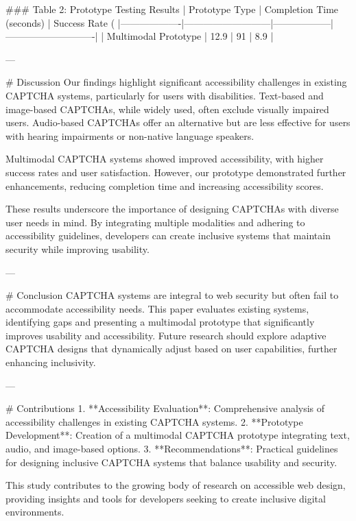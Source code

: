 ### Table 2: Prototype Testing Results  
| Prototype Type    | Completion Time (seconds) | Success Rate (%
|-------------------|---------------------------|------------------|----------------------------|  
| Multimodal Prototype | 12.9                  | 91               | 8.9                        |  

---

# Discussion  
Our findings highlight significant accessibility challenges in existing CAPTCHA systems, particularly for users with disabilities. Text-based and image-based CAPTCHAs, while widely used, often exclude visually impaired users. Audio-based CAPTCHAs offer an alternative but are less effective for users with hearing impairments or non-native language speakers.  

Multimodal CAPTCHA systems showed improved accessibility, with higher success rates and user satisfaction. However, our prototype demonstrated further enhancements, reducing completion time and increasing accessibility scores.  

These results underscore the importance of designing CAPTCHAs with diverse user needs in mind. By integrating multiple modalities and adhering to accessibility guidelines, developers can create inclusive systems that maintain security while improving usability.  

---

# Conclusion  
CAPTCHA systems are integral to web security but often fail to accommodate accessibility needs. This paper evaluates existing systems, identifying gaps and presenting a multimodal prototype that significantly improves usability and accessibility. Future research should explore adaptive CAPTCHA designs that dynamically adjust based on user capabilities, further enhancing inclusivity.  

---

# Contributions  
1. **Accessibility Evaluation**: Comprehensive analysis of accessibility challenges in existing CAPTCHA systems.  
2. **Prototype Development**: Creation of a multimodal CAPTCHA prototype integrating text, audio, and image-based options.  
3. **Recommendations**: Practical guidelines for designing inclusive CAPTCHA systems that balance usability and security.  

This study contributes to the growing body of research on accessible web design, providing insights and tools for developers seeking to create inclusive digital environments.